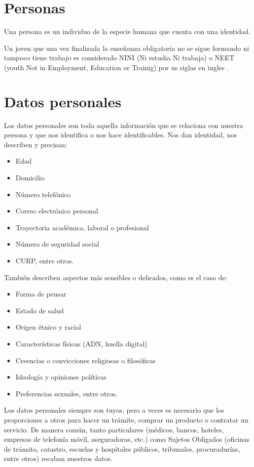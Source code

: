 \newpage
\section{Personas}
Una persona es un individuo de la especie humana que cuenta con una identidad\cite{Personas_1}.

Un joven que una vez finalizada la enseñanza obligatoria no se sigue formando ni tampoco tiene trabajo es considerado NINI (Ni estudia Ni trabaja) o NEET (youth Not in Employment, Education or Trainig) por us siglas en ingles\cite{BenitoDuranRomo} \cite{OECD1}.

\bigskip
\section{Datos personales}
    Los datos personales son toda aquella información que se relaciona con nuestra persona y que nos identifica o nos hace identificables\cite{Personas_DP}. Nos dan identidad, nos describen y precisan:
    \begin{itemize}
      \item Edad
      \item Domicilio
      \item Número telefónico
      \item Correo electrónico personal
      \item Trayectoria académica, laboral o profesional
      \item Número de seguridad social
      \item CURP, entre otros.
    \end{itemize}
También describen aspectos más sensibles o delicados, como es el caso de:
    \begin{itemize}
      \item Forma de pensar
      \item Estado de salud
      \item Origen étnico y racial
      \item Características físicas (ADN, huella digital)
      \item Creencias o convicciones religiosas o filosóficas
      \item Ideología y opiniones políticas
      \item Preferencias sexuales, entre otros.
    \end{itemize}
    
    Los datos personales siempre son tuyos, pero a veces es necesario que los proporciones a otros para hacer un trámite, comprar un producto o contratar un servicio. De manera común, tanto particulares (médicos, bancos, hoteles, empresas de telefonía móvil, aseguradoras, etc.) como Sujetos Obligados (oficinas de tránsito, catastro, escuelas y hospitales públicos, tribunales, procuradurías, entre otros) recaban nuestros datos.

